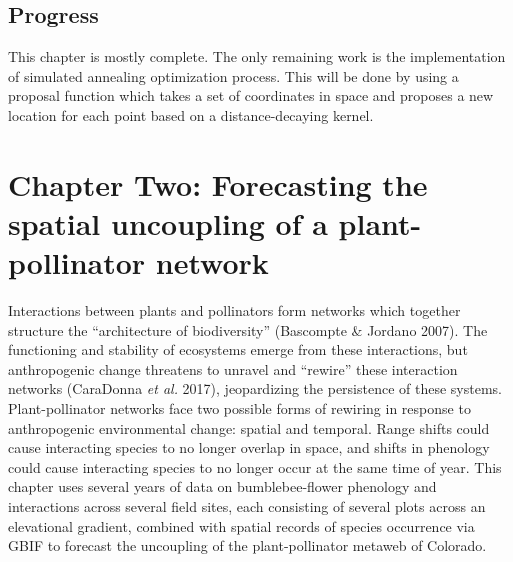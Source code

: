 \documentclass[10pt,oneside]{article}
\begin{document}
\hypertarget{progress}{%
\subsection{Progress}\label{progress}}

This chapter is mostly complete. The only remaining work is the
implementation of simulated annealing optimization process. This will be
done by using a proposal function which takes a set of coordinates in
space and proposes a new location for each point based on a
distance-decaying kernel.

\hypertarget{chapter-two-forecasting-the-spatial-uncoupling-of-a-plant-pollinator-network}{%
\section{Chapter Two: Forecasting the spatial uncoupling of a
plant-pollinator
network}\label{chapter-two-forecasting-the-spatial-uncoupling-of-a-plant-pollinator-network}}

Interactions between plants and pollinators form networks which together
structure the ``architecture of biodiversity'' (Bascompte \& Jordano
2007). The functioning and stability of ecosystems emerge from these
interactions, but anthropogenic change threatens to unravel and
``rewire'' these interaction networks (CaraDonna \emph{et al.} 2017),
jeopardizing the persistence of these systems. Plant-pollinator networks
face two possible forms of rewiring in response to anthropogenic
environmental change: spatial and temporal. Range shifts could cause
interacting species to no longer overlap in space, and shifts in
phenology could cause interacting species to no longer occur at the same
time of year. This chapter uses several years of data on
bumblebee-flower phenology and interactions across several field sites,
each consisting of several plots across an elevational gradient,
combined with spatial records of species occurrence via GBIF to forecast
the uncoupling of the plant-pollinator metaweb of Colorado.
\end{document}
